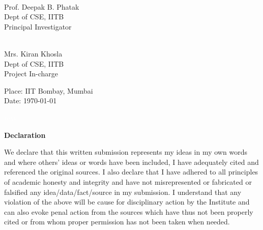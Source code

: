 \documentclass[12pt]{report}
\begin{document}
\vfill

\begin{multicols}{2}
\underline{\hspace{5cm}} \\
\indent Prof. Deepak B. Phatak \\
\indent Dept of CSE, IITB \\
\indent Principal Investigator \\

\begin{flushright}
\underline{\hspace{5cm}} \\
 Mrs. Kiran Khosla\\
\indent Dept of CSE, IITB \\
\indent Project In-charge \\
\end{flushright}
\end{multicols}

\vfill
%
% 
 
 \vfill
 Place: IIT Bombay, Mumbai \\
\indent Date: \today

 \pagebreak \thispagestyle{empty} \textcolor{white}{text} \pagebreak
 
\LARGE
\thispagestyle{empty}

\begin{center}
\textbf{Declaration}
\end{center}
\normalsize
We declare that this written submission represents my ideas in my own words and where 
others' ideas or words have been included, I have adequately cited and referenced the original 
sources.  I also declare that I have adhered to all principles of academic honesty and integrity 
and   have   not   misrepresented   or   fabricated   or   falsified   any   idea/data/fact/source   in   my 
submission.  I understand that any violation of the above will be cause for disciplinary action 
by the Institute and can also evoke  penal action from the sources which have thus not been 
properly cited or from whom proper permission has not been taken when needed.
\end{document}

